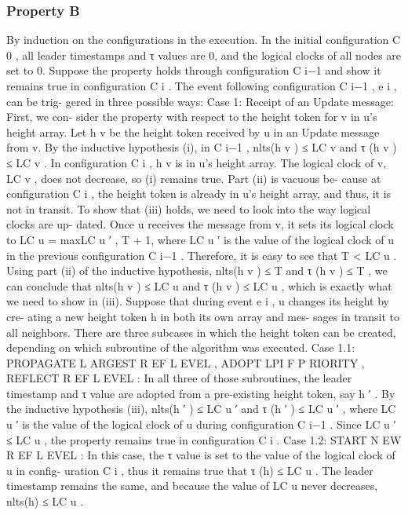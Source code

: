 \documentclass{article}
\begin{document}
\subsubsection{Property B}
By induction on the configurations in the execution.
In the initial configuration C 0 , all leader timestamps and
τ values are 0, and the logical clocks of all nodes are set to
0. Suppose the property holds through configuration C i−1
and show it remains true in configuration C i .
The event following configuration C i−1 , e i , can be trig-
gered in three possible ways:
Case 1: Receipt of an Update message: First, we con-
sider the property with respect to the height token for v in
u’s height array. Let h v be the height token received by u in
an Update message from v. By the inductive hypothesis (i),
in C i−1 , nlts(h v ) ≤ LC v and τ (h v ) ≤ LC v . In configuration
C i , h v is in u’s height array. The logical clock of v, LC v , does
not decrease, so (i) remains true. Part (ii) is vacuous be-
cause at configuration C i , the height token is already in u’s
height array, and thus, it is not in transit. To show that (iii)
holds, we need to look into the way logical clocks are up-
dated. Once u receives the message from v, it sets its logical
clock to LC u = max{LC u ′ , T } + 1, where LC u ′ is the value
of the logical clock of u in the previous configuration C i−1 .
Therefore, it is easy to see that T < LC u . Using part (ii) of
the inductive hypothesis, nlts(h v ) ≤ T and τ (h v ) ≤ T , we
can conclude that nlts(h v ) ≤ LC u and τ (h v ) ≤ LC u , which is
exactly what we need to show in (iii).
Suppose that during event e i , u changes its height by cre-
ating a new height token h in both its own array and mes-
sages in transit to all neighbors. There are three subcases in
which the height token can be created, depending on which
subroutine of the algorithm was executed.
Case
1.1:
PROPAGATE L ARGEST R EF L EVEL ,
ADOPT LPI F P RIORITY , REFLECT R EF L EVEL :
In all
three of those subroutines, the leader timestamp and τ
value are adopted from a pre-existing height token, say
h ′ . By the inductive hypothesis (iii), nlts(h ′ ) ≤ LC u ′ and
τ (h ′ ) ≤ LC u ′ , where LC u ′ is the value of the logical clock
of u during configuration C i−1 . Since LC u ′ ≤ LC u , the
property remains true in configuration C i .
Case 1.2: START N EW R EF L EVEL : In this case, the τ
value is set to the value of the logical clock of u in config-
uration C i , thus it remains true that τ (h) ≤ LC u . The leader
timestamp remains the same, and because the value of LC u
never decreases, nlts(h) ≤ LC u .
\end{document}
